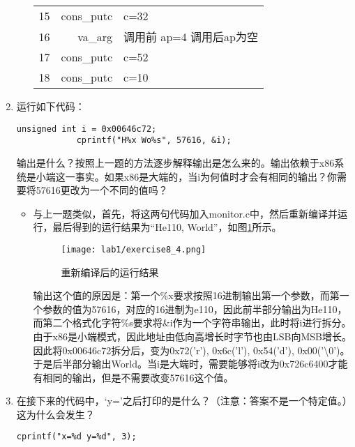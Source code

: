 \begin{enumerate}
\begin{itemize}
\begin{table}[H]
\begin{tabular}{c r l}
                        15 & cons\_putc & c=32  \\
                        16 & va\_arg    & 调用前 ap=4 调用后ap为空 \\
                        17 & cons\_putc & c=52  \\
                        18 & cons\_putc & c=10  \\
                        \bottomrule
                    \end{tabular}
                \end{table}
        \end{itemize}
    \item 运行如下代码：
        \begin{lstlisting}[gobble=12]
            unsigned int i = 0x00646c72;
            cprintf("H%x Wo%s", 57616, &i);
        \end{lstlisting}
        输出是什么？按照上一题的方法逐步解释输出是怎么来的。输出依赖于x86系统是小端这一事实。如果x86是大端的，当i为何值时才会有相同的输出？你需要将57616更改为一个不同的值吗？
        \begin{itemize}
            \item 与上一题类似，首先，将这两句代码加入monitor.c中，然后重新编译并运行，最后得到的运行结果为``He110, World''，如图\ref{fig:exercise8_4}所示。
                \begin{figure}[htb]
                    \centering
                    \texttt{[image: lab1/exercise8\_4.png]}
                    \caption{重新编译后的运行结果}
                    \label{fig:exercise8_4}
                \end{figure}
                \par 输出这个值的原因是：第一个\%x要求按照16进制输出第一个参数，而第一个参数的值为57616，对应的16进制为e110，因此前半部分输出为He110，而第二个格式化字符\%s要求将\&i作为一个字符串输出，此时将i进行拆分。由于x86是小端模式，因此地址由低向高增长时字节也由LSB向MSB增长。因此将0x00646c72拆分后，变为0x72('r'), 0x6c('l'), 0x54('d'), 0x00('\textbackslash 0')。于是后半部分输出World。当i是大端时，需要能够将i改为0x726c6400才能有相同的输出，但是不需要改变57616这个值。
        \end{itemize}
    \item 在接下来的代码中，`y='之后打印的是什么？（注意：答案不是一个特定值。）这为什么会发生？
        \begin{lstlisting}[gobble=12]
            cprintf("x=%d y=%d", 3);
        \end{lstlisting}
        \begin{itemize}

\end{itemize}
\end{enumerate}
